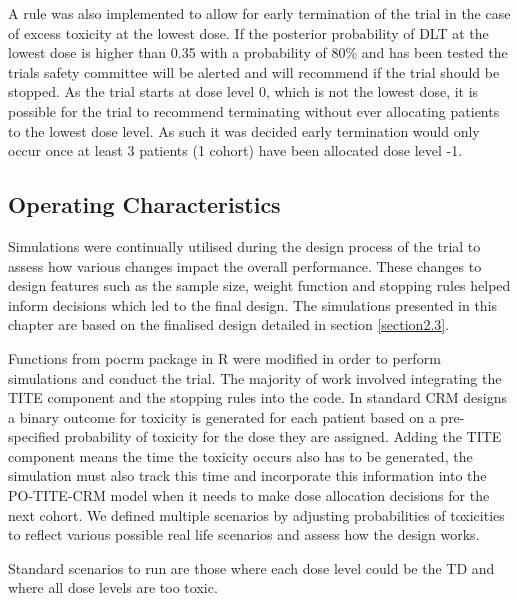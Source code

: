 A rule was also implemented to allow for early termination of the trial in the case of excess toxicity at the lowest dose. If the posterior probability of DLT at the lowest dose is higher than 0.35 with a probability of 80\% and has been tested the trials safety committee will be alerted and will recommend if the trial should be stopped. As the trial starts at dose level 0, which is not the lowest dose, it is possible for the trial to recommend terminating without ever allocating patients to the lowest dose level. As such it was decided early termination would only occur once at least 3 patients (1 cohort) have been allocated dose level -1. 

\subsection{Operating Characteristics}
\label{section2.3.4}%

Simulations were continually utilised during the design process of the trial to assess how various changes impact the overall performance. These changes to design features such as the sample size, weight function and stopping rules helped inform decisions which led to the final design. The simulations presented in this chapter are based on the finalised design detailed in section \ref{section2.3}. 

Functions from pocrm package in R \cite{wagesPocrmRpackagePhase2013, wagesPocrmDoseFinding2019} were modified in order to perform simulations and conduct the trial. The majority of work involved integrating the TITE component and the stopping rules into the code. In standard CRM designs a binary outcome for toxicity is generated for each patient based on a pre-specified probability of toxicity for the dose they are assigned. Adding the TITE component means the time the toxicity occurs also has to be generated, the simulation must also track this time and incorporate this information into the PO-TITE-CRM model when it needs to make dose allocation decisions for the next cohort. We defined multiple scenarios by adjusting probabilities of toxicities to reflect various possible real life scenarios and assess how the design works.  

Standard scenarios to run are those where each dose level could be the TD and where all dose levels are too toxic. 

